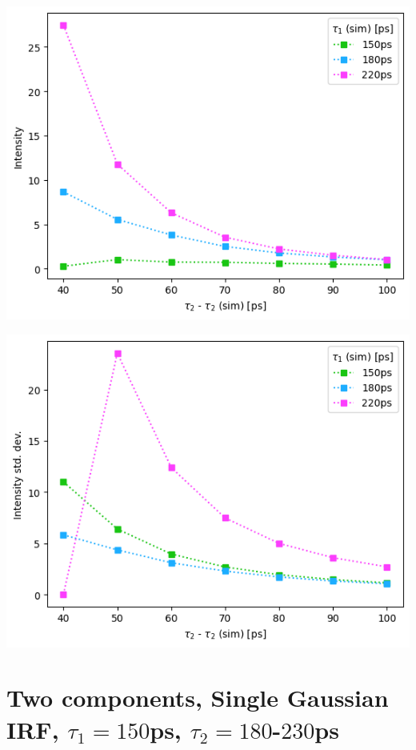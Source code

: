 {\begin{minipage}{.47\linewidth}
    \includegraphics[width=\linewidth]{Batch 3/regular IRF/8020-diff i1.png}
    \label{fig:comp-I-8020}
\end{minipage}
\hfill
\begin{minipage}{.47\linewidth}
    \includegraphics[width=\linewidth]{Batch 3/regular IRF/8020-err i1.png}
    \label{fig:comp-Ierr-8020}
\end{minipage}

\section{\boldmath Two components, Single Gaussian IRF, $\tau_1 = 150$ps, $\tau_2=180$-$230$ps\unboldmath\label{1g}}

}
